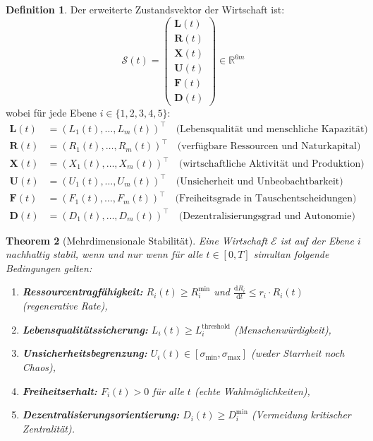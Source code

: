 \documentclass[a4paper, 12pt, twoside, openright]{report}
\newtheorem{theorem}{Theorem}[section]
\theoremstyle{definition}
\newtheorem{definition}[theorem]{Definition}
\theoremstyle{definition}
\begin{document}
\begin{definition}
\label{def:zustandsvektor}
Der erweiterte Zustandsvektor der Wirtschaft ist:
\begin{equation}
\mathcal{S}(t) = \left(
\begin{array}{c}
\mathbf{L}(t) \\
\mathbf{R}(t) \\
\mathbf{X}(t) \\
\mathbf{U}(t) \\
\mathbf{F}(t) \\
\mathbf{D}(t)
\end{array}
\right) \in \mathbb{R}^{6m}
\end{equation}
wobei für jede Ebene $i \in \{1, 2, 3, 4, 5\}$:
\begin{align}
\mathbf{L}(t) &= (L_1(t), \ldots, L_m(t))^{\top} \quad \text{(Lebensqualität und menschliche Kapazität)} \\
\mathbf{R}(t) &= (R_1(t), \ldots, R_m(t))^{\top} \quad \text{(verfügbare Ressourcen und Naturkapital)} \\
\mathbf{X}(t) &= (X_1(t), \ldots, X_m(t))^{\top} \quad \text{(wirtschaftliche Aktivität und Produktion)} \\
\mathbf{U}(t) &= (U_1(t), \ldots, U_m(t))^{\top} \quad \text{(Unsicherheit und Unbeobachtbarkeit)} \\
\mathbf{F}(t) &= (F_1(t), \ldots, F_m(t))^{\top} \quad \text{(Freiheitsgrade in Tauschentscheidungen)} \\
\mathbf{D}(t) &= (D_1(t), \ldots, D_m(t))^{\top} \quad \text{(Dezentralisierungsgrad und Autonomie)}
\end{align}
\end{definition}

\begin{theorem}[Mehrdimensionale Stabilität]
\label{thm:mehrdimensionale-stabilitaet}
Eine Wirtschaft $\mathcal{E}$ ist auf der Ebene $i$ nachhaltig stabil, wenn und nur wenn für alle $t \in [0,T]$ simultan folgende Bedingungen gelten:

\begin{enumerate}
\item \textbf{Ressourcentragfähigkeit:} $R_i(t) \geq R_i^{\min}$ und $\frac{\mathrm{d}R_i}{\mathrm{d}t} \leq r_i \cdot R_i(t)$ (regenerative Rate),
\item \textbf{Lebensqualitätssicherung:} $L_i(t) \geq L_i^{\text{threshold}}$ (Menschenwürdigkeit),
\item \textbf{Unsicherheitsbegrenzung:} $U_i(t) \in [\sigma_{\min}, \sigma_{\max}]$ (weder Starrheit noch Chaos),
\item \textbf{Freiheitserhalt:} $F_i(t) > 0$ für alle $t$ (echte Wahlmöglichkeiten),
\item \textbf{Dezentralisierungsorientierung:} $D_i(t) \geq D_i^{\min}$ (Vermeidung kritischer Zentralität).
\end{enumerate}
\end{theorem}
\end{document}
